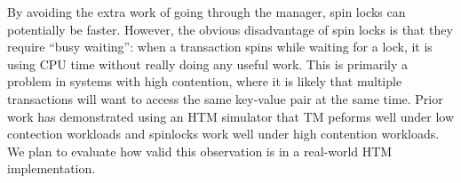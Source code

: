 By avoiding the extra work of going through the manager, spin locks can
potentially be faster. However, the obvious disadvantage of spin locks is that
they require ``busy waiting'': when a transaction spins while waiting for a
lock, it is using CPU time without really doing any useful work. This is
primarily a problem in systems with high contention, where it is likely that
multiple transactions will want to access the same key-value pair at the same
time. Prior work \citep{tran2010} has demonstrated using an HTM simulator that
TM peforms well under low contection workloads and spinlocks work well under
high contention workloads. We plan to evaluate how valid this observation is in
a real-world HTM implementation.

